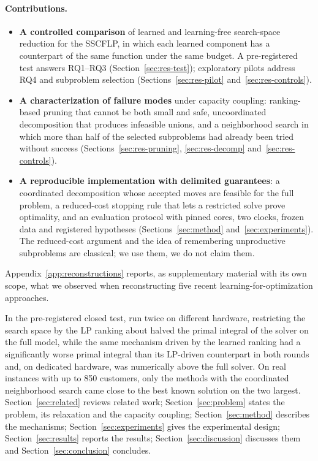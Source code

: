 \paragraph{Contributions.}
\begin{itemize}
\item \textbf{A controlled comparison} of learned and learning-free search-space reduction for the
SSCFLP, in which each learned component has a counterpart of the same function under the same
budget. A pre-registered test answers RQ1--RQ3 (Section~\ref{sec:res-test}); exploratory pilots
address RQ4 and subproblem selection (Sections~\ref{sec:res-pilot} and~\ref{sec:res-controls}).
\item \textbf{A characterization of failure modes} under capacity coupling: ranking-based pruning
that cannot be both small and safe, uncoordinated decomposition that produces infeasible unions,
and a neighborhood search in which more than half of the selected subproblems had already been
tried without success (Sections~\ref{sec:res-pruning}, \ref{sec:res-decomp}
and~\ref{sec:res-controls}).
\item \textbf{A reproducible implementation with delimited guarantees}: a coordinated
decomposition whose accepted moves are feasible for the full problem, a reduced-cost stopping
rule that lets a restricted solve prove optimality, and an evaluation protocol with pinned cores,
two clocks, frozen data and registered hypotheses (Sections~\ref{sec:method}
and~\ref{sec:experiments}). The reduced-cost argument and the idea of remembering unproductive
subproblems are classical; we use them, we do not claim them.
\end{itemize}
Appendix~\ref{app:reconstructions} reports, as supplementary material with its own scope, what we
observed when reconstructing five recent learning-for-optimization approaches.

In the pre-registered closed test, run twice on different hardware, restricting the search
space by the LP ranking about halved the primal integral of the solver on the full model, while
the same mechanism driven by the learned ranking had a significantly worse primal integral than
its LP-driven counterpart in both rounds and, on dedicated hardware, was numerically above the full
solver. On real instances with up to
850 customers, only the methods with the coordinated neighborhood search came close to the best
known solution on the two largest.
Section~\ref{sec:related} reviews related work; Section~\ref{sec:problem} states the problem, its
relaxation and the capacity coupling; Section~\ref{sec:method} describes the mechanisms;
Section~\ref{sec:experiments} gives the experimental design; Section~\ref{sec:results} reports
the results; Section~\ref{sec:discussion} discusses them and Section~\ref{sec:conclusion}
concludes.
